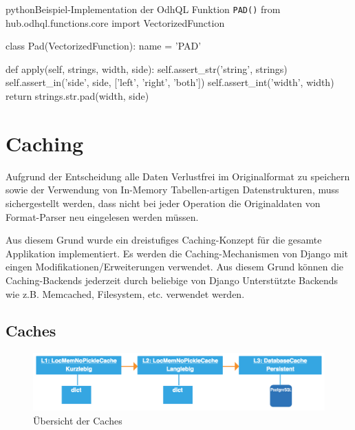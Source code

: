 \begin{srclst}[label=src:pd:odhql-function]{python}{Beispiel-Implementation der OdhQL Funktion \texttt{PAD()}}
from hub.odhql.functions.core import VectorizedFunction

class Pad(VectorizedFunction):
    name = 'PAD'

    def apply(self, strings, width, side):
        self.assert_str('string', strings)
        self.assert_in('side', side, ['left', 'right', 'both'])
        self.assert_int('width', width)
        return strings.str.pad(width, side)
\end{srclst}


\section{Caching}
Aufgrund der Entscheidung alle Daten Verlustfrei im Originalformat zu speichern sowie der Verwendung von In-Memory Tabellen-artigen Datenstrukturen, muss sichergestellt werden, dass nicht bei jeder Operation die Originaldaten von Format-Parser neu eingelesen werden müssen.

Aus diesem Grund wurde ein dreistufiges Caching-Konzept für die gesamte Applikation implementiert. Es werden die Caching-Mechanismen von Django mit eingen Modifikationen/Erweiterungen verwendet. Aus diesem Grund können die Caching-Backends jederzeit durch beliebige von Django Unterstützte Backends wie z.B. Memcached, Filesystem, etc. verwendet werden.

\subsection{Caches}

\xxx[ref]
\begin{figure}[H]
\centering
\includegraphics[width=\linewidth]{fig/caching.pdf}
\caption{Übersicht der Caches}
\label{fig:pd:caches}
\end{figure}

